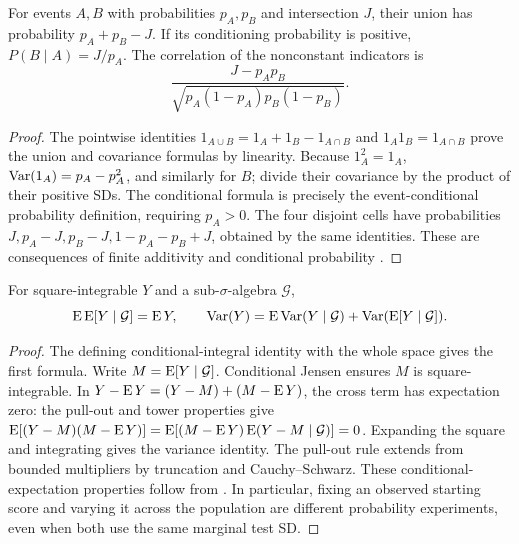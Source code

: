 \begin{proposition}
\label{pf:events}
For events \(A,B\) with probabilities \(p_A,p_B\) and intersection
\(J\), their union has probability \(p_A+p_B-J\). If its conditioning
probability is positive, \(P(B\mid A)=J/p_A\). The correlation of the
nonconstant indicators is
\[
 \frac{J-p_Ap_B}{\sqrt{p_A(1-p_A)p_B(1-p_B)}}.
\]
\end{proposition}
\begin{proof}
The pointwise identities
\(1_{A\cup B}=1_A+1_B-1_{A\cap B}\) and
\(1_A1_B=1_{A\cap B}\) prove the union and covariance formulas by
linearity. Because \(1_A^2=1_A\),
\(\operatorname{Var}(1_A)=p_A-p_A^2\), and similarly for \(B\); divide their
covariance by the product of their positive SDs. The conditional formula
is precisely the event-conditional probability definition, requiring
\(p_A>0\). The four disjoint cells have probabilities
\(J,p_A-J,p_B-J,1-p_A-p_B+J\), obtained by the same identities.
These are consequences of finite additivity and conditional probability
\citep[Sections 1.1 and 4.1]{durrett2019}.
\end{proof}

\begin{proposition}
\label{pf:expectation}
For square-integrable \(Y\) and a sub-\(\sigma\)-algebra \(\mathcal G\),
\[
 \operatorname{E}\operatorname{E}[Y\mid\mathcal G]=\operatorname{E} Y,\qquad
 \operatorname{Var}(Y)=\operatorname{E}\operatorname{Var}(Y\mid\mathcal G)
              +\operatorname{Var}(\operatorname{E}[Y\mid\mathcal G]).
\]
\end{proposition}
\begin{proof}
The defining conditional-integral identity with the whole space gives
the first formula. Write \(M=\operatorname{E}[Y\mid\mathcal G]\). Conditional
Jensen \citep[Theorem 4.1.10]{durrett2019} ensures \(M\) is
square-integrable. In
\(Y-\operatorname{E} Y=(Y-M)+(M-\operatorname{E} Y)\), the cross term has expectation zero:
the pull-out and tower properties give
\(\operatorname{E}[(Y-M)(M-\operatorname{E} Y)]
=\operatorname{E}[(M-\operatorname{E} Y)\operatorname{E}(Y-M\mid\mathcal G)]=0\).
Expanding the square and integrating gives the variance identity. The
pull-out rule extends from bounded multipliers by truncation and
Cauchy--Schwarz. These conditional-expectation properties follow from
\citet[Section 4.1, especially Theorems 4.1.13--4.1.14]{durrett2019}.
In particular, fixing an observed starting score and varying it across
the population are different probability experiments, even when both
use the same marginal test SD.
\end{proof}
